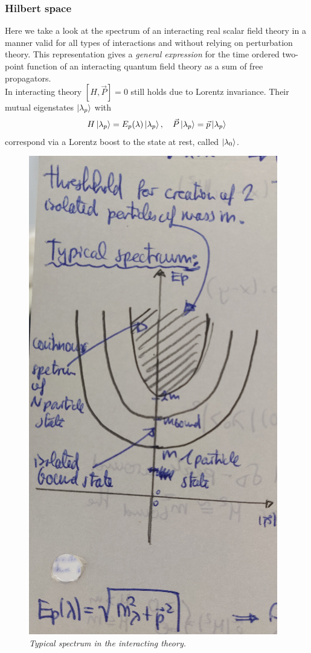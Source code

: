 \subsubsection{Hilbert space}
Here we take a look at the spectrum of an interacting real scalar field theory in a manner valid for all types of interactions and without relying on perturbation theory. This representation gives a \emph{general expression} for the time ordered two-point function of an interacting quantum field theory as a sum of free propagators.\\
In interacting theory $[H,\vec{P}]=0$ still holds due  to Lorentz invariance. Their mutual eigenstates $\ket{\lambda_p}$ with
\begin{equation}
	H\ket{\lambda_p}=E_p(\lambda) \ket{\lambda_p}, \quad \vec{P}\ket{\lambda_p} = \vec{p} \ket{\lambda_p}
\end{equation}
correspond via a Lorentz boost to the state at rest, called $\ket{\lambda_0}$.\\
\begin{figure}
	\centering
	\includegraphics[width=0.7\linewidth]{gfx/Spectruminteractingtheory}
	\caption{\itshape Typical spectrum in the interacting theory.}
	\label{fig:spectruminteractingtheory}
\end{figure}
